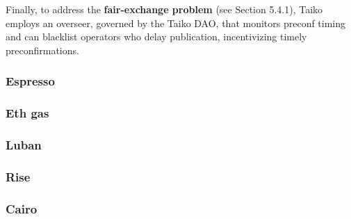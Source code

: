 \documentclass[a4paper]{article}
\theoremstyle{boldstyle}
\begin{document}
        Finally, to address the \textbf{fair-exchange problem} (see Section 5.4.1), Taiko employs an overseer, governed by the Taiko DAO, that monitors preconf timing and can blacklist operators who delay publication, incentivizing timely preconfirmations.    
        
        \subsubsection{ \textbf{Espresso}}
        
        \subsubsection{ \textbf{Eth gas}}
        
        \subsubsection{ \textbf{Luban}}
        
        \subsubsection{ \textbf{Rise}}
        
        \subsubsection{ \textbf{Cairo}}
        
\end{document}
